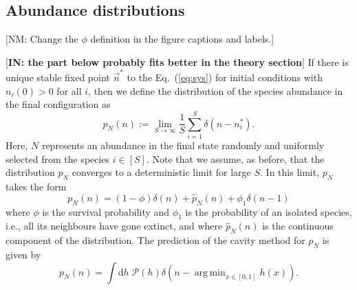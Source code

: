 \documentclass[11pt,a4paper]{article}
\DeclareMathOperator*{\argmin}{arg\,min}
\newcommand{\nm}[1]{{\color{red}[NM: #1]}}
\begin{document}
\subsection{Abundance distributions}\label{sec:abundances}
\nm{Change the $\phi$ definition in the figure captions and labels.}

[{\bf IN: the part below probably fits better in the theory section}]
If there is unique stable fixed point $\vec{n}^\ast$ to the Eq.~(\ref{eq:sys}) for initial conditions with $n_i(0)>0$ for all $i$, then we define the distribution of the species abundance  in the final configuration as 
\begin{equation}
    p_N(n) :=   \lim_{S\rightarrow \infty} \frac{1}{S}\sum^S_{i=1}\delta(n - n^\ast_i) . 
\end{equation} 
Here, $N$ represents an abundance in the final state randomly and uniformly selected from the species $i\in[S]$.   Note that we assume, as before, that the distribution $p_N$ converges to a deterministic limit for large $S$.    In this limit, $p_N$ takes the form 
\begin{equation}
p_N(n) = (1-\phi) \delta(n) +  \hat{p}_N(n) + \phi_1 \delta(n-1)
\end{equation}
where $\phi$ is the survival probability and $\phi_1$ is the probability of an isolated species, i.e., all its neighbours have gone extinct, and where $\hat{p}_N(n)$ is the continuous component of the distribution.    The prediction of the cavity method  for $p_N$ is given by 
\begin{equation}
p_N(n) = \int \mathrm{d}h \; \mathcal{P}(h) \delta\left(n - \argmin_{x \in[0,1]} h(x)\right). \label{eq:pNCav}
\end{equation} 
\end{document}
